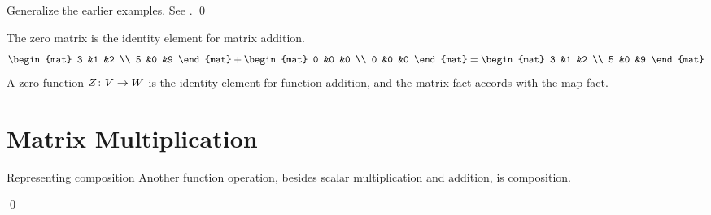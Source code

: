 \documentclass[9pt,t]{beamer}
\begin{document}
\begin{frame}
\th[th:MatOpsRepMapOps]

\pause
\pf
Generalize the earlier examples.
See \hspace{-0.25em}.
\qed

\pause
\medskip
\df[df:ZeroMatrix]

\pause
\medskip
\ex
The zero matrix is the identity element for matrix addition.
\begin{equation*}
  \begin{mat}
    3 &1 &2 \\
    5 &0 &9
  \end{mat}
  +
  \begin{mat}
    0 &0 &0 \\
    0 &0 &0
  \end{mat}
  =
  \begin{mat}
    3 &1 &2 \\
    5 &0 &9
  \end{mat}
\end{equation*}
A zero function
$\mbox{$Z\colon V\to W$}$ is the identity element for
function addition, and the matrix fact accords with the map fact. 
\end{frame}




\section{Matrix Multiplication}
\begin{frame}{Representing composition}
Another function operation,
besides scalar multiplication and addition,   
is composition.

\pause
\lm[lm:CompositionOfLinearMapsIsLinear]

\pause
\pf
{}
\qed

\end{frame}
\end{document}
